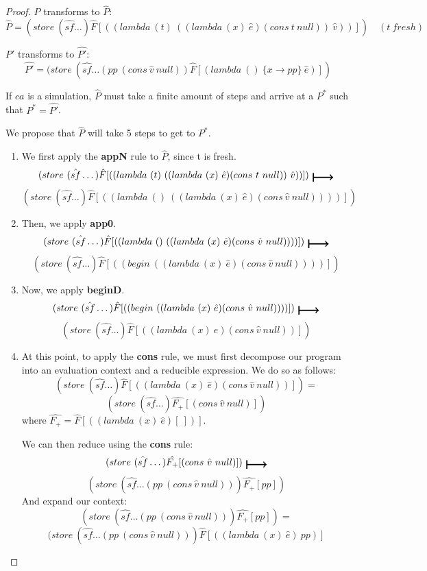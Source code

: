 \begin{proof}
$P$ transforms to $\hat{P}$:
\[
\hat{P} = (store\ (\hat{sf} \dots) \hat{F}[((lambda\ (t)\ ((lambda\ (x)\ \hat{e})(cons\ t\ null))\ \hat{v}))]) \quad (t\ fresh)
\]

$P'$ transforms to $\hat{P'}$:
\[
\hat{P'} = (store\ (\hat{sf} \dots (pp\ (cons\ \hat{v}\ null)) \hat{F}[(lambda\ ()\ \{x \xrightarrow{} pp\}\ \hat{e})])
\]

If $ca$ is a simulation, $\hat{P}$ must take a finite amount of steps and arrive at a $P^{*}$ such that $P^{*} = \hat{P'}$.

We propose that $\hat{P}$ will take 5 steps to get to $P^{*}$.
\begin{enumerate}
    \item We first apply the \textbf{appN} rule to $\hat{P}$, since t is fresh.
    \[
    (store\ (\hat{sf} \dots) \hat{F}[((lambda\ (t)\ ((lambda\ (x)\  \hat{e})(cons\ t\ null))\ \hat{v}))])\ \step
    \]
    \[
    (store\ (\hat{sf} \dots) \hat{F}[((lambda\ ()\ ((lambda\ (x)\  \hat{e})(cons\ \hat{v}\ null))))])
    \]
    \item Then, we apply \textbf{app0}.
    \[
    (store\ (\hat{sf} \dots) \hat{F}[((lambda\ ()\ ((lambda\ (x)\  \hat{e})(cons\ \hat{v}\ null))))])\ \step
    \]
    \[
    (store\ (\hat{sf} \dots) \hat{F}[((begin\ ((lambda\ (x)\  \hat{e})(cons\ \hat{v}\ null))))])
    \]
    \item Now, we apply \textbf{beginD}.
    \[
    (store\ (\hat{sf} \dots) \hat{F}[((begin\ ((lambda\ (x)\  \hat{e})(cons\ \hat{v}\ null))))])\ \step
    \]
    \[
    (store\ (\hat{sf} \dots) \hat{F}[((lambda\ (x)\  \hat{e})(cons\ \hat{v}\ null))])
    \]
    \item At this point, to apply the \textbf{cons} rule, we must first decompose our program into an evaluation context and a reducible expression. We do so as follows:
    \[
    (store\ (\hat{sf} \dots) \hat{F}[((lambda\ (x)\  \hat{e})(cons\ \hat{v}\ null))]) = 
    \]
    \[
    (store\ (\hat{sf} \dots) \hat{F_{+}}[(cons\ \hat{v}\ null)])
    \]
    where $\hat{F_{+}} = \hat{F}[((lambda\ (x)\ \hat{e})[\ ])]$.
    
    We can then reduce using the \textbf{cons} rule:
    \[
    (store\ (\hat{sf} \dots) \hat{F_{+}}[(cons\ \hat{v}\ null)])\ \step
    \]
    \[
    (store\ (\hat{sf} \dots (pp\ (cons\ \hat{v}\ null))) \hat{F_{+}}[pp])
    \]
    And expand our context:
    \[
    (store\ (\hat{sf} \dots (pp\ (cons\ \hat{v}\ null))) \hat{F_{+}}[pp]) = 
    \]
    \[
    (store\ (\hat{sf} \dots (pp\ (cons\ \hat{v}\ null)))\hat{F}[((lambda\ (x)\ \hat{e})\ pp)]
    \]
    

\end{enumerate}
\end{proof}
